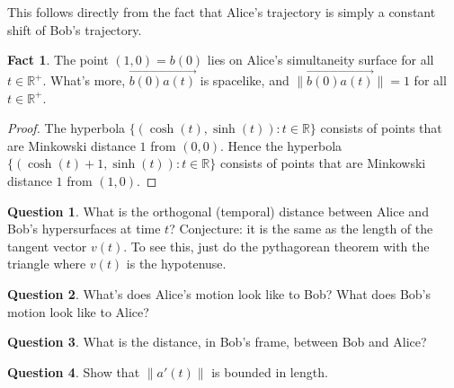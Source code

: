 \documentclass[tikz,border=10pt,fleqn]{article}
\theoremstyle{definition}
\newtheorem*{question}{Question}
\newtheorem*{fact}{Fact}
\newcommand{\vecc}[1]{\overrightarrow{#1}}
\begin{document}
This follows directly from the fact that Alice's trajectory is simply
a constant shift of Bob's trajectory.

\begin{fact} The point $(1,0)=b(0)$ lies on Alice's simultaneity
  surface for all $t\in\mathbb{R}^+$. What's more, $\vecc{b(0)a(t)}$
  is spacelike, and $\| \vecc{b(0)a(t)}\| =1$ for all
  $t\in\mathbb{R}^+$. \end{fact}

\begin{proof} The hyperbola
  $\{ (\cosh (t),\sinh(t)):t\in\mathbb{R} \}$ consists of points that
  are Minkowski distance $1$ from $(0,0)$. Hence the hyperbola
  $\{ (\cosh (t)+1,\sinh (t)):t\in\mathbb{R}\}$ consists of points
  that are Minkowski distance $1$ from $(1,0)$.
\end{proof}


\begin{question} What is the orthogonal (temporal) distance between
  Alice and Bob's hypersurfaces at time $t$? Conjecture: it is the
  same as the length of the tangent vector $v(t)$. To see this, just
  do the pythagorean theorem with the triangle where $v(t)$ is the
  hypotenuse. \end{question}

\begin{question} What's does Alice's motion look like to Bob? What
  does Bob's motion look like to Alice? \end{question}

\begin{question} What is the distance, in Bob's frame, between Bob and
  Alice? \end{question}

\begin{question} Show that $\| a'(t)\|$ is bounded in
  length. \end{question}   
\end{document}
